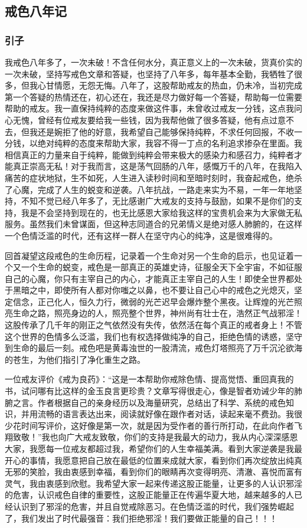 \subsection{戒色八年记}

\setcounter{subsubsection}{-1}
\subsubsection{引子}

我戒色八年多了，一次未破！不含任何水分，真正意义上的一次未破，货真价实的一次未破，坚持写戒色文章和答疑，也坚持了八年多，每年基本全勤，我牺牲了很多，但我心甘情愿，无怨无悔。八年了，这股帮助戒友的热血，仍未冷，当初完成第一个答疑的热情还在，初心还在，我还是尽力做好每一个答疑，帮助每一位需要帮助的戒友。我一直保持纯粹的态度来做这件事，未曾收过戒友一分钱，这点我问心无愧，曾经有位戒友要给我一些钱，因为我帮他做了很多答疑，他有点过意不去，但我还是婉拒了他的好意，我希望自己能够保持纯粹，不求任何回报，不收一分钱，以绝对纯粹的态度来帮助大家，我容不得一丁点的名利追求掺杂在里面。我相信真正的力量来自于纯粹，能做到纯粹会带来极大的感染力和感召力，纯粹者才能真正崇高无私！对于我而言，这是荡气回肠的八年，感慨万千的八年，在我陷入痛苦的症状地狱，生不如死，人生进入读秒时间和至暗时刻时，我奋起戒色，绝杀了心魔，完成了人生的蜕变和逆袭。八年抗战，一路走来实为不易，一年一年地坚持，不知不觉已经八年多了，无比感谢广大戒友的支持与鼓励，如果不是你们的支持，我是不会坚持到现在的，也无比感恩大家给我这样的宝贵机会来为大家做无私服务。虽然我们未曾谋面，但这种志同道合的兄弟情义是绝对感人肺腑的，在这样一个色情泛滥的时代，还有这样一群人在坚守内心的纯净，这是很难得的。

回首凝望这段戒色的生命历程，记录着一个生命对另一个生命的启示，也见证着一个又一个生命的蜕变，戒色是一部真正的英雄史诗，征服全天下全宇宙，不如征服自己的心魔，你只有主宰自己的内心，才能真正主宰自己的人生！即使全世界都处于黑暗之中，即使所有人都对你嗤之以鼻，也不要让自己心中的戒色之光熄灭，坚定信念，正己化人，恒久力行，微弱的光芒迟早会爆炸整个黑夜。让辉煌的光芒照亮生命之路，照亮身边的人，照亮整个世界，神州尚有壮士在，浩然正气战邪淫！这股传承了几千年的刚正之气依然没有失传，依然活在每个真正的戒者身上！不管这个世界的色情多么泛滥，我们也有权选择做纯净的自己，拒绝色情的诱惑，坚守到生命的最后一刻。戒色吧是黄毒浊世的一股清流，戒色灯塔照亮了万千沉沦欲海的苍生，为他们指引了净化重生之路。

一位戒友评价《戒为良药》：“这是一本帮助你戒除色情、提高觉悟、重回真我的书，试问哪有比这样的金玉良言更珍贵？文章写得很走心，像是智者劝诫少年的肺腑之言。作者根据自己的亲身经历以及海量研究，总结出了科学、系统的戒色知识，并用流畅的语言表达出来，阅读就好像在跟作者对话，读起来毫不费劲。我很少花时间写评价，这好像是第一次，就是因为受作者的善行所打动，在此向作者飞翔致敬！”我也向广大戒友致敬，你们的支持是我最大的动力，我从内心深深感恩大家，我愿每一位戒友都超过我，希望你们的人生幸福美满。看到大家逆袭是我最开心的事情，我愿意把自己放在最低的位置来成就大家，看到你们再次绽放出纯真无邪的笑脸，我由衷感到幸福，看到你们的眼睛再次变得明亮、清澈、喜悦而富有灵气，我由衷感到欣慰。我希望大家一起来传递这股正能量，让更多的人认识邪淫的危害，认识戒色自律的重要性，这股正能量正在传遍华夏大地，越来越多的人已经认识到了邪淫的危害，并且自觉戒除恶习。在色情泛滥的时代，我们强势崛起了，我们发出了时代最强音：我们拒绝邪淫！我们要做正能量的自己！！！

